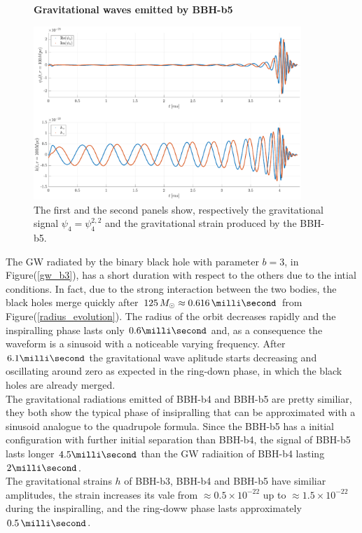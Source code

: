    \begin{figure}[h!]
\centering
    \textbf{Gravitational waves emitted by BBH-b5}\par\medskip
\centering
\includegraphics[width=0.9\textwidth]{numerical_evolution/gw_b5.eps}
   \caption{The first and the second panels show, respectively the gravitational signal $\psi_4=\psi_4 ^{2,2}$ and the gravitational strain produced by the BBH-b5.}
\label{gw_b5}
\end{figure}
The GW radiated by the binary black hole with parameter $b=3$, in Figure(\ref{gw_b3}), has a short duration with respect to the others due to the intial conditions.
In fact, due to the strong interaction between the two bodies, the black holes merge quickly after $125 \, M_{\odot} \approx 0.616 \, \milli \second$ from Figure(\ref{radius_evolution}). 
The radius of the orbit decreases rapidly and the inspiralling phase lasts only $0.6 \milli \second$ and, as a consequence the waveform is a sinusoid with a noticeable varying frequency.
After $6.1 \milli \second$ the gravitational wave aplitude starts decreasing and oscillating around zero as expected in the ring-down phase, in which the black holes are already merged. 
\\
The gravitational radiations emitted of BBH-b4 and BBH-b5 are pretty similiar, they both show the typical phase of insipralling that can be approximated with a sinusoid analogue to the quadrupole formula.
Since the BBH-b5 has a initial configuration with further initial separation than BBH-b4, the signal of BBH-b5 lasts longer $4.5 \milli \second$ than the GW radiaition of BBH-b4 lasting $2 \milli \second$.\\
The gravitational strains $h$ of BBH-b3, BBH-b4 and BBH-b5 have similiar amplitudes, the strain increases its vale from $\approx 0.5 \times 10^{-22}$ up to $\approx1.5 \times 10^{-22}$ during the inspiralling, and the ring-doww phase lasts approximately $0.5 \, \milli \second$.\\
